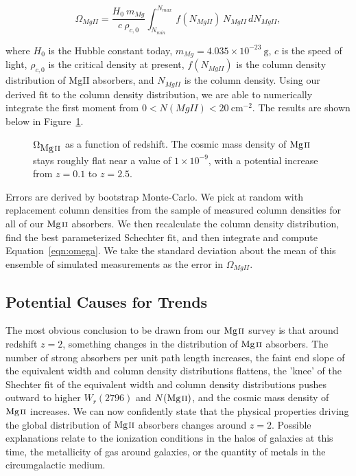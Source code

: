 \documentclass[iop,apj,numberedappendix,appendixfloats,twocolappendix]{emulateapj}
\begin{document}
\begin{equation}
\Omega_{MgII} = \frac{H_0\  m_{Mg}}{c\ \rho_{c,0}} \int_{N_{min}}^{N_{max}}\, f (N_{MgII})\, N_{MgII}\, dN_{MgII} ,
\label{eqn:omega}
\end{equation}

where $H_0$ is the Hubble constant today, $m_{Mg} = 4.035 \times 10^{-23}~\mathrm{g}$, $c$ is the speed of light, $\rho_{c,0}$ is the critical density at present, $f(N_{MgII})$ is the column density distribution of {MgII} absorbers, and $N_{MgII}$ is the column density. Using our derived fit to the column density distribution, we are able to numerically integrate the first moment from $0 < N(MgII) < 20~\mathrm{cm^{-2}}$. The results are shown below in Figure~\ref{fig:omegamgii}. 

\begin{figure*}[bth]
\caption{$\Omega_{\hbox{{\rm Mg}\kern 0.1em{\sc ii}}}$ as a function of redshift. The cosmic mass density of ${\hbox{{\rm Mg}\kern 0.1em{\sc ii}}}$ stays roughly flat near a value of $1 \times 10^{-9}$, with a potential increase from $z = 0.1$ to $z = 2.5$.}
\label{fig:omegamgii}
\end{figure*}

Errors are derived by bootstrap Monte-Carlo. We pick at random with replacement column densities from the sample of measured column densities for all of our ${\hbox{{\rm Mg}\kern 0.1em{\sc ii}}}$ absorbers. We then recalculate the column density distribution, find the best parameterized Schechter fit, and then integrate and compute Equation~\ref{eqn:omega}. We take the standard deviation about the mean of this ensemble of simulated measurements as the error in $\Omega_{MgII}$. 

\subsection{Potential Causes for Trends}
\label{trendcauses}

The most obvious conclusion to be drawn from our ${\hbox{{\rm Mg}\kern 0.1em{\sc ii}}}$ survey is that around redshift $z = 2$, something changes in the distribution of ${\hbox{{\rm Mg}\kern 0.1em{\sc ii}}}$ absorbers. The number of strong absorbers per unit path length increases, the faint end slope of the equivalent width and column density distributions flattens, the 'knee' of the Shechter fit of the equivalent width and column density distributions pushes outward to higher $W_r(2796)$ and $N(\hbox{{\rm Mg}\kern 0.1em{\sc ii}})$, and the cosmic mass density of ${\hbox{{\rm Mg}\kern 0.1em{\sc ii}}}$ increases. We can now confidently state that the physical properties driving the global distribution of ${\hbox{{\rm Mg}\kern 0.1em{\sc ii}}}$ absorbers changes around $z = 2$. Possible explanations relate to the ionization conditions in the halos of galaxies at this time, the metallicity of gas around galaxies, or the quantity of metals in the circumgalactic medium.
\end{document}
